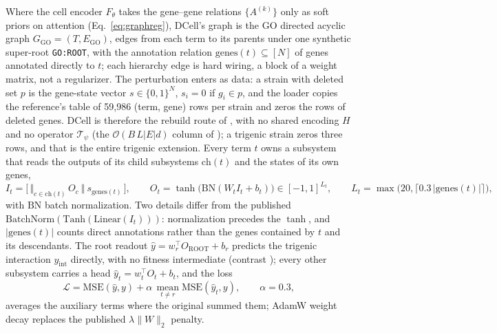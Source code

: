  Where the cell encoder $F_\theta$ takes the gene--gene
relations $\{A^{(k)}\}$ only as soft priors on attention (Eq.~\ref{eq:graphreg}), DCell's
graph is the GO directed acyclic graph $G_{\mathrm{GO}}=(T,E_{\mathrm{GO}})$, edges from each
term to its parents under one synthetic super-root \texttt{GO:ROOT}, with the annotation
relation $\mathrm{genes}(t)\subseteq[N]$ of genes annotated directly to $t$; each hierarchy
edge is hard wiring, a block of a weight matrix, not a regularizer. The perturbation enters as
data: a strain with deleted set $p$ is the gene-state vector $s\in\{0,1\}^{N}$, $s_i=0$ if
$g_i\in p$, and the loader copies the reference's table of 59,986 (term, gene) rows per
strain and zeros the rows of deleted genes. DCell is therefore the rebuild route of
, with no shared encoding $H$ and no operator
$\mathcal{T}_\psi$ (the $\mathcal{O}(B\,L\lvert E\rvert d)$ column of );
a trigenic strain zeros three rows, and that is the entire trigenic extension. Every term $t$
owns a subsystem that reads the outputs of its child subsystems $\mathrm{ch}(t)$ and the
states of its own genes,
\begin{equation}
I_t=\big[\,\Vert_{c\in\mathrm{ch}(t)}\,O_c\ \big\Vert\ s_{\mathrm{genes}(t)}\,\big],\qquad
O_t=\tanh\!\big(\mathrm{BN}(W_tI_t+b_t)\big)\in[-1,1]^{L_t},\qquad
L_t=\max\!\big(20,\lceil 0.3\,\lvert\mathrm{genes}(t)\rvert\rceil\big),
\label{eq:dcell-subsystem}
\end{equation}
with $\mathrm{BN}$ batch normalization. Two details differ from the published
$\mathrm{BatchNorm}(\mathrm{Tanh}(\mathrm{Linear}(I_t)))$: normalization precedes the
$\tanh$, and $\lvert\mathrm{genes}(t)\rvert$ counts direct annotations rather than the genes
contained by $t$ and its descendants. The root readout
$\hat y=w_r^{\top}O_{\mathrm{ROOT}}+b_r$ predicts the trigenic interaction $y_{\mathrm{int}}$
directly, with no fitness intermediate (contrast ); every
other subsystem carries a head $\hat y_t=w_t^{\top}O_t+b_t$, and the loss
\begin{equation}
\mathcal{L}=\mathrm{MSE}(\hat y,y)+\alpha\,\operatorname*{mean}_{t\neq r}\mathrm{MSE}(\hat y_t,y),\qquad \alpha=0.3,
\label{eq:dcell-loss}
\end{equation}
averages the auxiliary terms where the original summed them; AdamW weight decay replaces the
published $\lambda\lVert W\rVert_2$ penalty.

